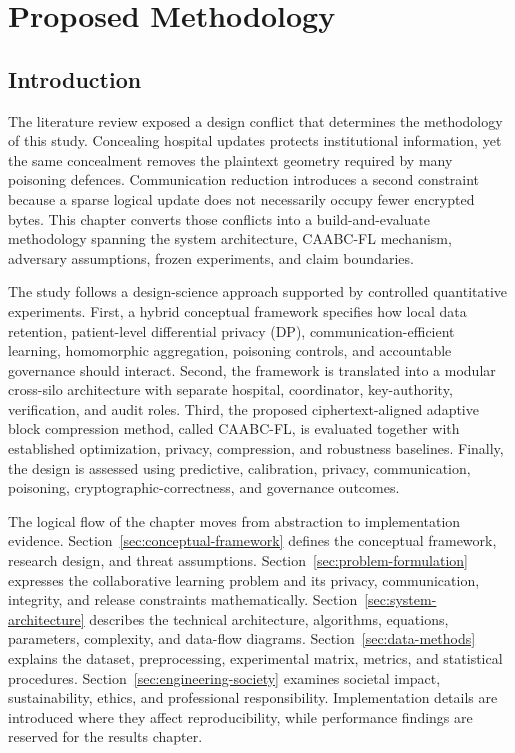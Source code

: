 \chapter{Proposed Methodology}
\label{chap:proposed-methodology}

\section{Introduction}
\label{sec:method-introduction}

The literature review exposed a design conflict that determines the methodology of this study. Concealing hospital updates protects institutional information, yet the same concealment removes the plaintext geometry required by many poisoning defences. Communication reduction introduces a second constraint because a sparse logical update does not necessarily occupy fewer encrypted bytes. This chapter converts those conflicts into a build-and-evaluate methodology spanning the system architecture, CAABC-FL mechanism, adversary assumptions, frozen experiments, and claim boundaries.

The study follows a design-science approach supported by controlled quantitative experiments. First, a hybrid conceptual framework specifies how local data retention, patient-level differential privacy (DP), communication-efficient learning, homomorphic aggregation, poisoning controls, and accountable governance should interact. Second, the framework is translated into a modular cross-silo architecture with separate hospital, coordinator, key-authority, verification, and audit roles. Third, the proposed ciphertext-aligned adaptive block compression method, called CAABC-FL, is evaluated together with established optimization, privacy, compression, and robustness baselines. Finally, the design is assessed using predictive, calibration, privacy, communication, poisoning, cryptographic-correctness, and governance outcomes.

The logical flow of the chapter moves from abstraction to implementation evidence. Section~\ref{sec:conceptual-framework} defines the conceptual framework, research design, and threat assumptions. Section~\ref{sec:problem-formulation} expresses the collaborative learning problem and its privacy, communication, integrity, and release constraints mathematically. Section~\ref{sec:system-architecture} describes the technical architecture, algorithms, equations, parameters, complexity, and data-flow diagrams. Section~\ref{sec:data-methods} explains the dataset, preprocessing, experimental matrix, metrics, and statistical procedures. Section~\ref{sec:engineering-society} examines societal impact, sustainability, ethics, and professional responsibility. Implementation details are introduced where they affect reproducibility, while performance findings are reserved for the results chapter.

